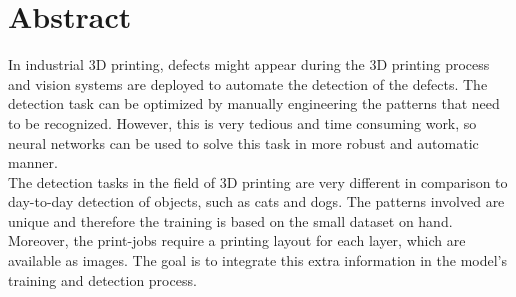 \section*{Abstract}
In industrial 3D printing, defects might appear during the 3D printing process and vision systems are deployed to automate the detection of the defects. The detection task can be optimized by manually engineering the patterns that need to be recognized. However, this is very tedious and time consuming work, so neural networks can be used to solve this task in more robust and automatic manner. \\
The detection tasks in the field of 3D printing are very different in comparison to day-to-day detection of objects, such as cats and dogs. The patterns involved are unique and therefore the training is based on the small dataset on hand. \\
Moreover, the print-jobs require a printing layout for each layer, which are available as images. The goal is to integrate this extra information in the model's training and detection process. \\

\cleardoublepage{}
